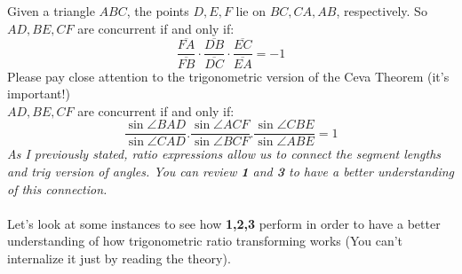 \documentclass[a4paper,12pt,twoside]{book}
\begin{document}
{Given a triangle $ABC$, the points $D, E, F$ lie on $BC, CA, AB$, respectively. So $AD, BE, CF$ are concurrent if and only if:
$${\displaystyle {\frac {\overline {FA}}{\overline {FB}}}\cdot {\frac {\overline {DB}}{\overline {DC}}}\cdot {\frac {\overline {EC}}{\overline {EA}}}=-1}$$
Please pay close attention to the trigonometric version of the Ceva Theorem (it's important!)\\
$AD,BE,CF$ are concurrent if and only if:
$${\displaystyle {\frac {\sin \angle BAD}{\sin \angle CAD}}. {\frac {\sin \angle ACF}{\sin \angle BCF}}. {\frac {\sin \angle CBE}{\sin \angle ABE}}=1}$$
\textit{As I previously stated, ratio expressions allow us to connect the segment lengths and trig version of angles. You can review \textbf{1} and \textbf{3} to have a better understanding of this connection.}\\\\
Let's look at some instances to see how \textbf{1,2,3} perform in order to have a better understanding of how trigonometric ratio transforming works (You can't internalize it just by reading the theory).
\newpage
}
\end{document}
